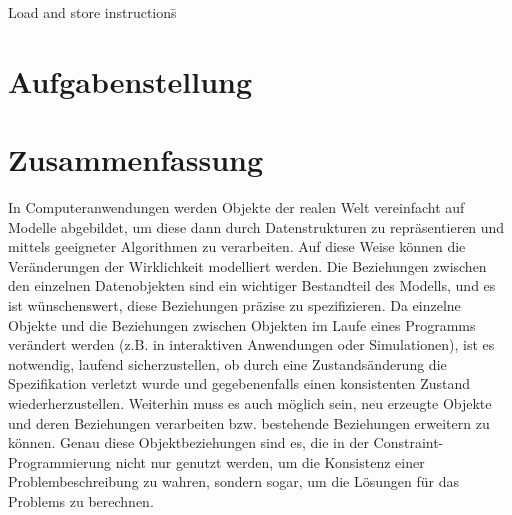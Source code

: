 




\begin{tabbing}
Load and store instructions\=\kill\\
\end{tabbing}
\cleardoublepage

\chapter*{Aufgabenstellung}


\cleardoublepage


\chapter*{Zusammenfassung}

In Computeranwendungen werden Objekte der realen Welt vereinfacht auf
Modelle abgebildet, um diese dann durch Datenstrukturen zu
repr\"asentieren und mittels geeigneter Algorithmen zu verarbeiten.
Auf diese Weise k\"onnen die Ver\"anderungen der Wirklichkeit
modelliert werden.  Die Beziehungen zwischen den einzelnen
Datenobjekten sind ein wichtiger Bestandteil des Modells, und es ist
w\"unschenswert, diese Beziehungen pr\"azise zu spe\-zi\-fi\-zie\-ren.
Da einzelne Objekte und die Beziehungen zwischen Objekten im Laufe
eines Programms ver\"andert werden (z.B. in interaktiven Anwendungen
oder Simulationen), ist es notwendig, laufend sicherzustellen, ob
durch eine Zustands\"anderung die Spezifikation verletzt wurde und
gegebenenfalls einen konsistenten Zustand wiederherzustellen.
Weiterhin muss es auch m\"oglich sein, neu erzeugte Objekte und deren
Beziehungen verarbeiten bzw. bestehende Beziehungen erweitern zu
k\"onnen.  Genau diese Objektbeziehungen sind es, die in der
Constraint-Programmierung nicht nur genutzt werden, um die Konsistenz
einer Problembeschreibung zu wahren, sondern sogar, um die L\"osungen
f\"ur das Problems zu berechnen.

